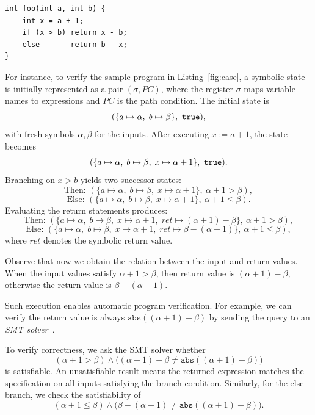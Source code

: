 \begin{listing}
\caption{\texttt{foo} computes the value \texttt{abs}($(a+1)-b$).}
\label{fig:case}

\begin{verbatim}
int foo(int a, int b) {
    int x = a + 1;
    if (x > b) return x - b;
    else       return b - x;
}
\end{verbatim}
\end{listing}


For instance, to verify the sample program in Listing~\ref{fig:case}, a symbolic state is initially represented as a pair \((\sigma, PC)\), where the register \(\sigma\) maps
variable names to expressions and \(PC\) is the path condition. The initial state is
{
\small
\[
(\{ a \mapsto \alpha,\; b \mapsto \beta \},\ \true ),
\]
}
with fresh symbols \(\alpha,\beta\) for the inputs. After executing \(x := a+1\),
the state becomes
{
\small
\[
(\{ a \mapsto \alpha,\; b \mapsto \beta,\; x \mapsto \alpha+1 \},\ \texttt{true}).
\]
Branching on \(x > b\) yields two successor states:
\[
\text{Then: }(\{ a \mapsto \alpha,\; b \mapsto \beta,\; x \mapsto \alpha+1 \},\ \alpha+1>\beta),
\]
\[
\text{Else: }(\{ a \mapsto \alpha,\; b \mapsto \beta,\; x \mapsto \alpha+1 \},\ \alpha+1\le \beta).
\]
}
Evaluating the return statements produces:
{
\small
\[
\text{Then: }(\{ a \mapsto \alpha,\; b \mapsto \beta,\; x \mapsto \alpha+1,\;
   ret \mapsto (\alpha+1)-\beta \},\ \alpha+1>\beta),
\]
\[
\text{Else: }(\{ a \mapsto \alpha,\; b \mapsto \beta,\; x \mapsto \alpha+1,\;
   ret \mapsto \beta-(\alpha+1) \},\ \alpha+1\le \beta),
\]
}
where \(ret\) denotes the symbolic return value.

Observe that now we obtain the relation between the input and return values. When the input values satisfy $\alpha+1>\beta$, then return value is $(\alpha+1)-\beta$, otherwise the return value is $\beta-(\alpha+1)$. 

Such execution enables automatic program verification. For example, we can verify the return value is always $\texttt{abs}((\alpha+1)-\beta)$ by sending the query to an \emph{SMT solver}~\cite{z3}. 

To verify correctness, we ask the SMT solver whether
{
\small
\[
(\alpha+1>\beta) \land 
\bigl((\alpha+1)-\beta \neq \texttt{abs}((\alpha+1)-\beta)\bigr)
\]
}
is satisfiable. An unsatisfiable result means the returned expression matches
the specification on all inputs satisfying the branch condition. Similarly, for
the else-branch, we check the satisfiability of
{
\small
\[
(\alpha+1\le\beta) \land 
\bigl(\beta-(\alpha+1) \neq \texttt{abs}((\alpha+1)-\beta)\bigr).
\]
}

